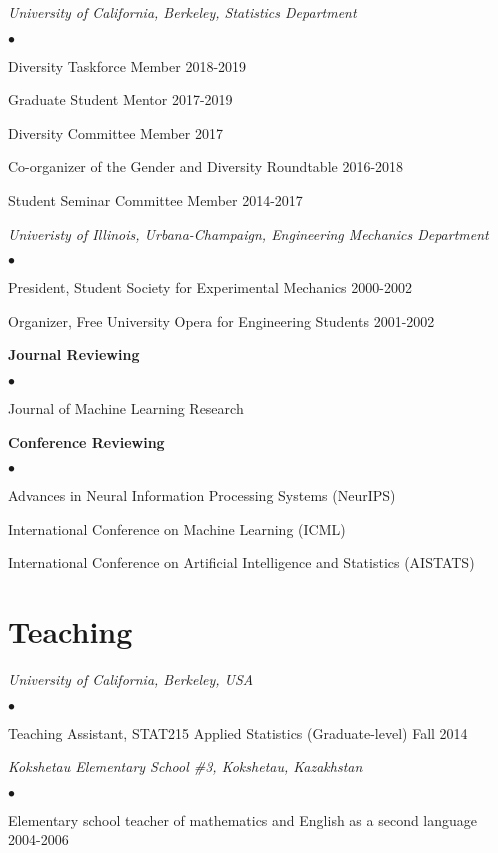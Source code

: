 \documentclass[margin,line]{res}
\newenvironment{list2}{
  \begin{list}{$\bullet$}{%
      \setlength{\itemsep}{0in}
      \setlength{\parsep}{0in} \setlength{\parskip}{0in}
      \setlength{\topsep}{0in} \setlength{\partopsep}{0in}
      \setlength{\leftmargin}{0.2in}}}{\end{list}}
\begin{document}
\begin{resume}
{\em University of California, Berkeley, Statistics Department}
\begin{list2}
    \item Diversity Taskforce Member \hfill 2018-2019
    \item Graduate Student Mentor \hfill 2017-2019
    \item Diversity Committee Member  \hfill 2017
    \item Co-organizer of the Gender and Diversity Roundtable \hfill 2016-2018
    \item Student Seminar Committee Member \hfill 2014-2017
\end{list2}

{\em Univeristy of Illinois, Urbana-Champaign, Engineering Mechanics Department}
\begin{list2}
    \item President, Student Society for Experimental Mechanics \hfill 2000-2002
    \item Organizer, Free University Opera for Engineering Students \hfill 2001-2002
\end{list2}


\textbf{Journal Reviewing}
\begin{list2}
\item Journal of Machine Learning Research
\end{list2}

\textbf{Conference Reviewing}
\begin{list2}
\item Advances in Neural Information Processing Systems (NeurIPS)
\item International Conference on Machine Learning (ICML)
\item International Conference on Artificial Intelligence and Statistics (AISTATS)
\end{list2}


\section{\sc Teaching}

\emph{University of California, Berkeley, USA}
\begin{list2}
\item Teaching Assistant, STAT215 Applied Statistics
(Graduate-level) \hfill Fall 2014
\end{list2}

\emph{Kokshetau Elementary School \#3, Kokshetau, Kazakhstan}
\begin{list2}
\item Elementary school teacher of mathematics and English as a second language
\hfill 2004-2006
\end{list2}


\end{resume}
\end{document}
